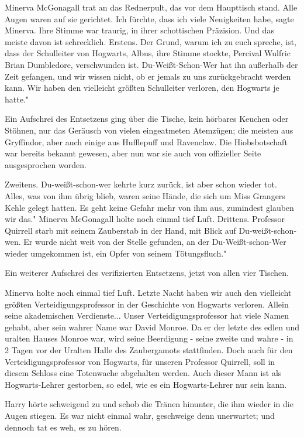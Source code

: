 Minerva McGonagall trat an das Rednerpult, das vor dem Haupttisch stand. Alle
Augen waren auf sie gerichtet. \glqq{}Ich fürchte, dass ich viele Neuigkeiten
habe\grqq{}, sagte Minerva. Ihre Stimme war traurig, in ihrer schottischen
Präzision. \glqq{}Und das meiste davon ist schrecklich. Erstens. Der Grund, warum
ich zu euch spreche, ist, dass der Schulleiter von Hogwarts, Albus\grqq{}, ihre
Stimme stockte, \glqq{}Percival Wulfric Brian Dumbledore, verschwunden ist.
Du-Weißt-Schon-Wer hat ihn außerhalb der Zeit gefangen, und wir wissen nicht, ob
er jemals zu uns zurückgebracht werden kann. Wir haben den vielleicht größten
Schulleiter verloren, den Hogwarts je hatte."

Ein Aufschrei des Entsetzens ging über die Tische, kein hörbares Keuchen oder
Stöhnen, nur das Geräusch von vielen eingeatmeten Atemzügen; die meisten aus
Gryffindor, aber auch einige aus Hufflepuff und Ravenclaw. Die Hiobsbotschaft
war bereits bekannt gewesen, aber nun war sie auch von offizieller Seite
ausgesprochen worden.

\glqq{}Zweitens. Du-weißt-schon-wer kehrte kurz zurück, ist aber schon wieder
tot. Alles, was von ihm übrig blieb, waren seine Hände, die sich um Miss
Grangers Kehle gelegt hatten. Es geht keine Gefahr mehr von ihm aus, zumindest
glauben wir das." Minerva McGonagall holte noch einmal tief Luft. \glqq{}
Drittens. Professor Quirrell starb mit seinem Zauberstab in der Hand, mit Blick
auf Du-weißt-schon-wen. Er wurde nicht weit von der Stelle gefunden, an der
Du-Weißt-schon-Wer wieder umgekommen ist, ein Opfer von seinem Tötungsfluch."

Ein weiterer Aufschrei des verifizierten Entsetzens, jetzt von allen vier
Tischen.

Minerva holte noch einmal tief Luft. \glqq{}Letzte Nacht haben wir auch den
vielleicht größten Verteidigungsprofessor in der Geschichte von Hogwarts
verloren. Allein seine akademischen Verdienste... Unser Verteidigungsprofessor
hat viele Namen gehabt, aber sein wahrer Name war David Monroe. Da er der letzte
des edlen und uralten Hauses Monroe war, wird seine Beerdigung - seine zweite
und wahre - in 2 Tagen vor der Uralten Halle des Zaubergamots stattfinden. Doch
auch für den Verteidigungsprofessor von Hogwarts, für unseren Professor
Quirrell, soll in diesem Schloss eine Totenwache abgehalten werden. Auch dieser
Mann ist als Hogwarts-Lehrer gestorben, so edel, wie es ein Hogwarts-Lehrer nur
sein kann.\grqq{}

Harry hörte schweigend zu und schob die Tränen hinunter, die ihm wieder in die
Augen stiegen. Es war nicht einmal wahr, geschweige denn unerwartet; und dennoch
tat es weh, es zu hören.

